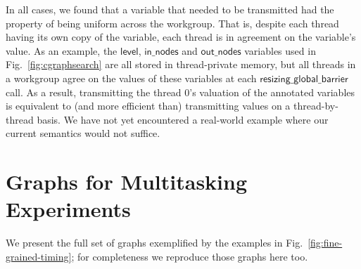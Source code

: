 \documentclass[sigconf]{acmart}
\newcommand{\myfig}{Fig.~}
\newcommand{\resizingglobalbarrier}{\mathsf{resizing\_global\_barrier}}
\newcommand{\keyword}[1]{\mathsf{#1}}
\begin{document}
{In all cases, we found that a variable that needed to be transmitted
had the property of being uniform across the workgroup.  That is,
despite each thread having its own copy of the variable, each thread
is in agreement on the variable's value.  As an example, the
$\keyword{level}$, $\keyword{in\_nodes}$ and $\keyword{out\_nodes}$
variables used in \myfig\ref{fig:cgraphsearch} are all stored in thread-private
memory, but all threads in a workgroup agree on the values of these
variables at each $\resizingglobalbarrier$ call.  As a result,
transmitting the thread 0's valuation of the annotated variables is
equivalent to (and more efficient than) transmitting values on a
thread-by-thread basis.  We have not yet encountered a real-world
example where our current semantics would not suffice.


\section{Graphs for Multitasking Experiments}\label{appendix:extragraphs}

We present the full set of graphs exemplified by the examples in
\myfig\ref{fig:fine-grained-timing}; for completeness we reproduce
those graphs here too.

}
\end{document}
